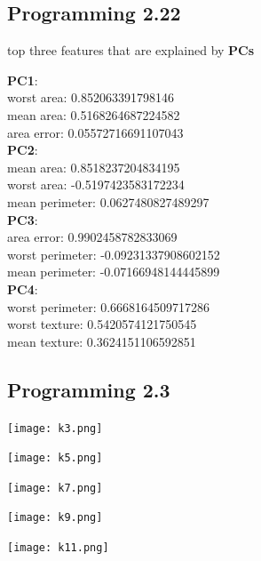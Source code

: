 \documentclass[12pt]{article}
\begin{document}
\subsection{Programming 2.22}
\begin{center}
  top three features that are explained by \textbf{PCs} \\
\end{center}
\textbf{PC1}:\\
  worst area: 0.852063391798146\\
  mean area: 0.5168264687224582\\
  area error: 0.05572716691107043\\
\textbf{PC2}:\\ 
  mean area: 0.8518237204834195\\
  worst area: -0.5197423583172234\\
  mean perimeter: 0.0627480827489297\\
\textbf{PC3}:\\ 
  area error: 0.9902458782833069\\
  worst perimeter: -0.09231337908602152\\
  mean perimeter: -0.07166948144445899\\
\textbf{PC4}:\\ 
  worst perimeter: 0.6668164509717286\\
  worst texture: 0.5420574121750545\\
  mean texture: 0.3624151106592851\\
  
\subsection{Programming 2.3}
\begin{center}
  \texttt{[image: k3.png]}
\end{center}
\begin{center}
  \texttt{[image: k5.png]}
\end{center}
\begin{center}
  \texttt{[image: k7.png]}
\end{center}
\begin{center}
  \texttt{[image: k9.png]}
\end{center}
\begin{center}
  \texttt{[image: k11.png]}
\end{center}
\end{document}
